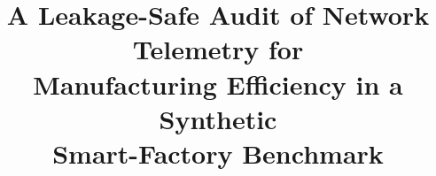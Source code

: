 \documentclass[conference]{IEEEtran}
\begin{document}
\title{A Leakage-Safe Audit of Network Telemetry for\\Manufacturing Efficiency in a Synthetic\\Smart-Factory Benchmark}

\author{
}

\nocite{haque2025urllc, ibrahim2025urllc, paudyal2025gnb, alves2021beyond, tgpp22104, kapoor2023leakage, kaufman2012leakage, lopez2018advances, cena2021redundancy, zunino2024adaptive, ferrari2011wireless, vitturi2019industrial, popovski20185g, breiman2001random, ke2017lightgbm, chen2016xgboost, seabold2010statsmodels, dickey1979distribution, granger1969investigating, benjamini1995controlling, andrews1993tests, hansen2000sample, pedregosa2011scikit, lundberg2017unified, rousseeuw1987silhouettes, davies1979cluster, calinski1974dendrite, gangurde2026repository}
\maketitle
\end{document}
